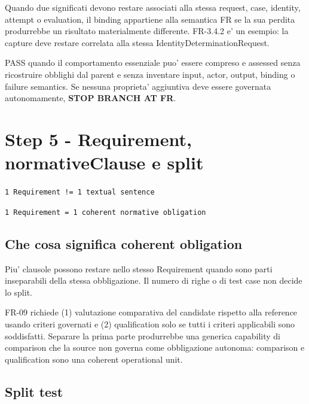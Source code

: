\documentclass[11pt,a4paper]{article}
\begin{document}
Quando due significati devono restare associati alla stessa request, case, identity, attempt o evaluation, il binding appartiene alla semantica FR se la sua perdita produrrebbe un risultato materialmente differente. FR-3.4.2 e' un esempio: la capture deve restare correlata alla stessa IdentityDeterminationRequest.

\begin{ddtacheck}[title={Gate D3 - FR + STOP}]
PASS quando il comportamento essenziale puo' essere compreso e assessed senza ricostruire obblighi dal parent e senza inventare input, actor, output, binding o failure semantics. Se nessuna proprieta' aggiuntiva deve essere governata autonomamente, \textbf{STOP BRANCH AT FR}.
\end{ddtacheck}

\section{Step 5 - Requirement, normativeClause e split}
\closedtag

\begin{ddtacore}
\texttt{1 Requirement != 1 textual sentence}\par
\texttt{1 Requirement  = 1 coherent normative obligation}
\end{ddtacore}

\subsection{Che cosa significa coherent obligation}

Piu' clausole possono restare nello stesso Requirement quando sono parti inseparabili della stessa obbligazione. Il numero di righe o di test case non decide lo split.

\begin{ddtaexample}[title={Negative control - DermaTriage FR-09 non si divide}]
FR-09 richiede (1) valutazione comparativa del candidate rispetto alla reference usando criteri governati e (2) qualification solo se tutti i criteri applicabili sono soddisfatti. Separare la prima parte produrrebbe una generica capability di comparison che la source non governa come obbligazione autonoma: comparison e qualification sono una coherent operational unit.
\end{ddtaexample}

\subsection{Split test}
\end{document}
